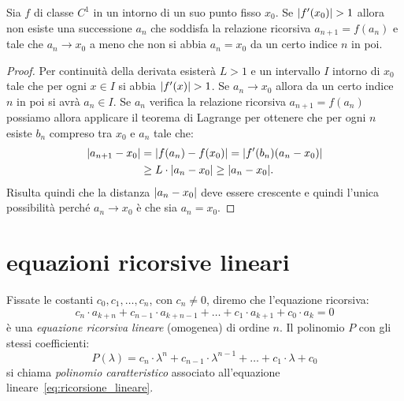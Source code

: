 \begin{theorem}
Sia $f$ di classe $C^1$ in un intorno di un suo punto fisso $x_0$.
Se ${\left|f'(x_0)\right|}>1$ allora non esiste una successione $a_n$ che soddisfa la relazione ricorsiva $a_{n+1} = f(a_n)$ e tale che $a_n \to x_0$ a meno che non si abbia $a_n = x_0$ da un certo indice $n$ in poi.
\end{theorem}
%
\begin{proof}
Per continuità della derivata esisterà $L>1$ e un intervallo $I$
intorno di $x_0$ tale che per ogni $x\in I$ si abbia ${\left|f'(x)\right|} > 1$.
Se $a_n \to x_0$ allora da un certo indice $n$
in poi si avrà $a_n \in I$.
Se $a_n$ verifica la relazione ricorsiva $a_{n+1} = f(a_n)$ possiamo
allora applicare il teorema di Lagrange per ottenere che per ogni $n$ esiste $b_n$ compreso tra $x_0$ e $a_n$ tale che:
\begin{align*}
  {\left|a_{n+1} - x_0\right|}
  &= {\left|f(a_n) - f(x_0)\right|}
  = {\left|f'(b_n)(a_n - x_0)\right|} \\
  &\ge L \cdot {\left|a_n - x_0\right|} \ge {\left|a_n - x_0\right|}.
\end{align*}
Risulta quindi che la distanza ${\left|a_n - x_0\right|}$ deve essere crescente
e quindi l'unica possibilità perché $a_n \to x_0$ è che sia $a_n = x_0$.
\end{proof}

\section{equazioni ricorsive lineari}
\label{sec:ricorrenza_lineare}

Fissate le costanti $c_0, c_1, \dots, c_n$,
con $c_n \neq 0$,
diremo che l'equazione ricorsiva:
\begin{equation}\label{eq:ricorsione_lineare}
  c_n \cdot a_{k+n} + c_{n-1} \cdot a_{k+n-1} + \dots
    + c_1 \cdot a_{k+1} + c_0 \cdot a_k = 0
\end{equation}
è una \emph{equazione ricorsiva lineare}%
 (omogenea) di ordine $n$.
Il polinomio $P$ con gli stessi coefficienti:
\[
  P(\lambda) = c_n \cdot \lambda^n + c_{n-1}\cdot \lambda^{n-1} + \dots + c_1 \cdot \lambda + c_0
\]
si chiama \emph{polinomio caratteristico}%
%
%
associato all'equazione
lineare~\eqref{eq:ricorsione_lineare}.

